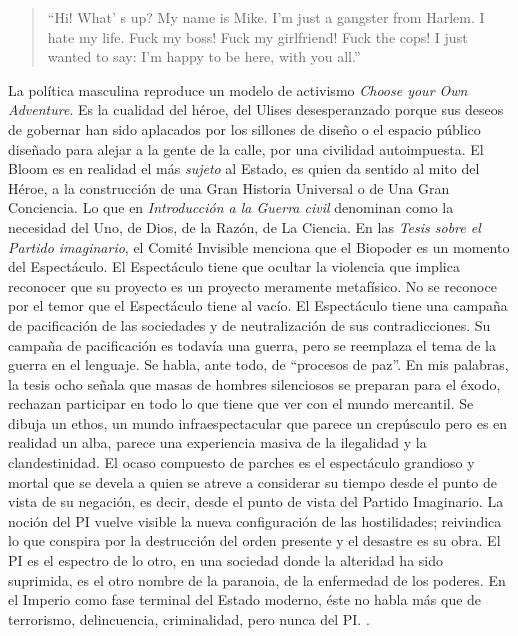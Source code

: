 \begin{quote}
  \enquote{Hi! What' s up? My name is Mike. I'm just a gangster from Harlem. I hate my life. Fuck my boss! Fuck my girlfriend! Fuck the cops! I just wanted to say: I'm happy to be here, with you all.} \autocite{comiteinvisibleNuestrosAmigos2015}
\end{quote}

La política masculina reproduce un modelo de activismo \emph{Choose your Own Adventure}. Es la cualidad del héroe, del Ulises desesperanzado porque sus deseos de gobernar han sido aplacados por los sillones de diseño o el espacio público diseñado para alejar a la gente de la calle, por una civilidad autoimpuesta. El Bloom es en realidad el más \emph{sujeto} al Estado, es quien da sentido al mito del Héroe, a la construcción de una Gran Historia Universal o de Una Gran Conciencia. Lo que en \emph{Introducción a la Guerra civil} denominan como la necesidad del Uno, de Dios, de la Razón, de La Ciencia. En las \emph{Tesis sobre el Partido imaginario}, el Comité Invisible menciona que el Biopoder es un momento del Espectáculo. El Espectáculo tiene que ocultar la violencia que implica reconocer que su proyecto es un proyecto meramente metafísico. No se reconoce por el temor que el Espectáculo tiene al vacío. El Espectáculo tiene una campaña de pacificación de las sociedades y de neutralización de sus contradicciones. Su campaña de pacificación es todavía una guerra, pero se reemplaza el tema de la guerra en el lenguaje. Se habla, ante todo, de \enquote{procesos de paz}. En mis palabras, la tesis ocho señala que masas de hombres silenciosos se preparan para el éxodo, rechazan participar en todo lo que tiene que ver con el mundo mercantil. Se dibuja un ethos, un mundo infraespectacular que parece un crepúsculo pero es en realidad un alba, parece una experiencia masiva de la ilegalidad y la clandestinidad. El ocaso compuesto de parches es el espectáculo grandioso y mortal que se devela a quien se atreve a considerar su tiempo desde el punto de vista de su negación, es decir, desde el punto de vista del Partido Imaginario. La noción del PI vuelve visible la nueva configuración de las hostilidades; reivindica lo que conspira por la destrucción del orden presente y el desastre es su obra. El PI es el espectro de lo otro, en una sociedad donde la alteridad ha sido suprimida, es el otro nombre de la paranoia, de la enfermedad de los poderes. En el Imperio como fase terminal del Estado moderno, éste no habla más que de terrorismo, delincuencia, criminalidad, pero nunca del PI. \autocite{tiqqunTesisSobrePartido}.

